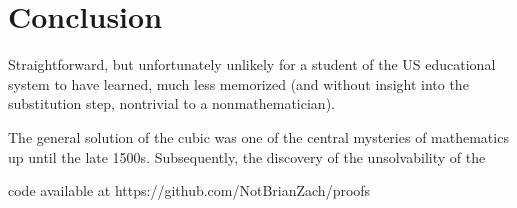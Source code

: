 \documentclass{article}
\theoremstyle{definition}
\theoremstyle{plain}
\begin{document}
\section{Conclusion}
Straightforward, but unfortunately unlikely for a student of the US educational system to have learned, much less memorized (and without insight into the substitution step, nontrivial to a nonmathematician).

The general solution of the cubic was one of the central mysteries of mathematics up until the late 1500s. Subsequently, the discovery of the unsolvability of the

code available at https://github.com/NotBrianZach/proofs
\end{document}

